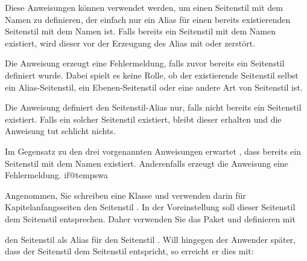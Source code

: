 \begin{Declaration}
\end{Declaration}
%
%
Diese Anweisungen können verwendet werden, um einen Seitenstil mit dem Namen
 zu definieren, der einfach nur ein Alias für
einen bereits existierenden Seitenstil mit dem Namen  ist. Falls bereits ein Seitenstil mit dem Namen
 existiert, wird dieser vor der Erzeugung des
Alias mit  oder 
zerstört.

Die Anweisung  erzeugt eine Fehlermeldung,
falls zuvor bereits ein Seitenstil 
definiert wurde. Dabei spielt es keine Rolle, ob der existierende Seitenstil
selbst ein Alias-Seitenstil, ein Ebenen-Seitenstil oder eine andere Art von
Seitenstil ist.

Die Anweisung  definiert den Seitenstil-Alias
nur, falls nicht bereits ein Seitenstil
 existiert. Falls ein solcher Seitenstil
existiert, bleibt dieser erhalten und die Anweisung tut schlicht nichts.

Im Gegensatz zu den drei vorgenannten Anweisungen erwartet
, dass bereits ein Seitenstil mit dem Namen
 existiert. Anderenfalls erzeugt die Anweisung
eine Fehlermeldung.
%
\csname if@tempswa\endcsname%
\begin{Example}
  Angenommen, Sie schreiben eine Klasse und verwenden darin für
  Kapitelanfangsseiten den Seitenstil . In der
  Voreinstellung soll dieser Seitenstil dem Seitenstil 
  entsprechen. Daher verwenden Sie das Paket  und definieren
  mit
\begin{lstcode}
\end{lstcode}
  den Seitenstil  als Alias für den Seitenstil
  . Will hingegen der Anwender später, dass der Seitenstil
   dem Seitenstil  entspricht, so erreicht
  er dies mit:
\begin{lstcode}
\end{lstcode}%
\end{Example}%
\fi
\EndIndexGroup



